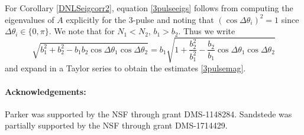 \documentclass[12pt]{elsarticle}
\begin{document}
For Corollary \ref{DNLSeigcorr2}, equation \eqref{3pulseeigs} follows from computing the eigenvalues of $A$ explicitly for the 3-pulse and noting that $(\cos \Delta \theta_i)^2 = 1$ since $\Delta \theta_i \in \{0, \pi\}$. We note that for $N_1 < N_2$, $b_1 > b_2$. Thus we write
\[
\sqrt{b_1^2 + b_2^2 - b_1 b_2\cos\Delta\theta_1 \cos\Delta\theta_2} = b_1
\sqrt{1 + \frac{b_2^2}{b_1^2} - \frac{b_2}{b_1} \cos\Delta\theta_1 \cos\Delta\theta_2} 
\]
and expand in a Taylor series to obtain the estimates \eqref{3pulsemag}.

\paragraph{Acknowledgements:}
Parker was supported by the NSF through grant DMS-1148284.
Sandstede was partially supported by the NSF through grant DMS-1714429.



\end{document}
